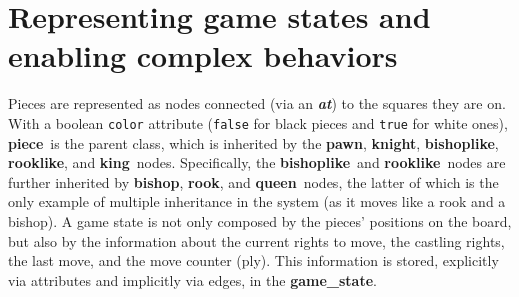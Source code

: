 \documentclass[a4paper, 10pt]{scrartcl}
\newcommand{\noderepr}[1]{\textsf{\textbf{#1}}}
\newcommand{\edgerepr}[1]{\textit{\textbf{#1}}}
\newcommand{\piece}{\noderepr{piece}}
\newcommand{\pawn}{\noderepr{pawn}}
\newcommand{\knight}{\noderepr{knight}}
\newcommand{\bishoplike}{\noderepr{bishoplike}}
\newcommand{\rooklike}{\noderepr{rooklike}}
\newcommand{\bishop}{\noderepr{bishop}}
\newcommand{\rook}{\noderepr{rook}}
\newcommand{\queen}{\noderepr{queen}}
\newcommand{\king}{\noderepr{king}}
\newcommand{\gamestate}{\noderepr{game\_state}}
\newcommand{\at}{\edgerepr{at}}
\begin{document}
    \section{Representing game states and enabling complex behaviors}
    Pieces are represented as nodes connected (via an \at) to the squares they are on. With a boolean \texttt{color} attribute (\texttt{false} for black pieces and \texttt{true} for white ones), \piece\ is the parent class, which is inherited by the \pawn, \knight, \bishoplike, \rooklike, and \king\ nodes. Specifically, the \bishoplike\ and \rooklike\ nodes are further inherited by \bishop, \rook, and \queen\ nodes, the latter of which is the only example of multiple inheritance in the system (as it moves like a rook and a bishop).
    A game state is not only composed by the pieces' positions on the board, but also by the information about the current rights to move, the castling rights, the last move, and the move counter (ply). This information is stored, explicitly via attributes and implicitly via edges, in the \gamestate.
\end{document}
